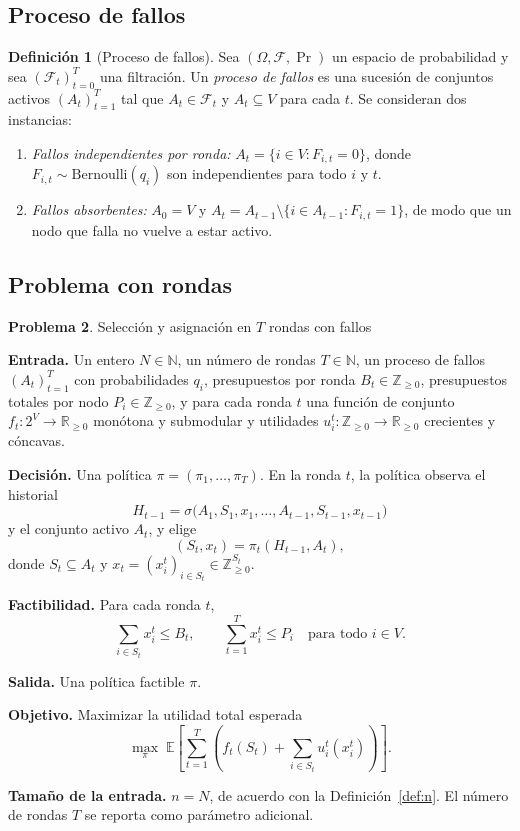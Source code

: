 \documentclass[11pt,a4paper]{article}
\theoremstyle{definition}
\newtheorem{definicion}{Definición}[section]
\newtheorem{problema}[definicion]{Problema}
\theoremstyle{plain}
\newcommand{\N}{\mathbb{N}}
\newcommand{\Z}{\mathbb{Z}}
\newcommand{\R}{\mathbb{R}}
\begin{document}
\subsection{Proceso de fallos}

\begin{definicion}[Proceso de fallos]
Sea $(\Omega,\mathcal{F},\Pr)$ un espacio de probabilidad y sea
$(\mathcal{F}_t)_{t=0}^{T}$ una filtración. Un \emph{proceso de fallos} es una
sucesión de conjuntos activos $(A_t)_{t=1}^{T}$ tal que $A_t\in\mathcal{F}_t$ y
$A_t\subseteq V$ para cada $t$. Se consideran dos instancias:
\begin{enumerate}[leftmargin=*,label=\roman*)]
  \item \emph{Fallos independientes por ronda:}
  $A_t=\{i\in V: F_{i,t}=0\}$, donde
  $F_{i,t}\sim\mathrm{Bernoulli}(q_i)$ son independientes para todo $i$ y $t$.
  \item \emph{Fallos absorbentes:} $A_0=V$ y
  $A_t=A_{t-1}\setminus\{i\in A_{t-1}: F_{i,t}=1\}$, de modo que un nodo que
  falla no vuelve a estar activo.
\end{enumerate}
\end{definicion}

\subsection{Problema con rondas}

\begin{problema}\label{prob:rondas} Selección y asignación en $T$ rondas con fallos

\textbf{Entrada.} Un entero $N\in\N$, un número de rondas $T\in\N$, un proceso
de fallos $(A_t)_{t=1}^{T}$ con probabilidades $q_i$, presupuestos por ronda
$B_t\in\Z_{\ge0}$, presupuestos totales por nodo $P_i\in\Z_{\ge0}$, y para cada
ronda $t$ una función de conjunto $f_t:2^V\to\R_{\ge0}$ monótona y submodular y
utilidades $u_i^t:\Z_{\ge0}\to\R_{\ge0}$ crecientes y cóncavas.

\textbf{Decisión.} Una política $\pi=(\pi_1,\dots,\pi_T)$. En la ronda $t$, la
política observa el historial
\[
  H_{t-1}=\sigma\bigl(A_1,S_1,x_1,\dots,A_{t-1},S_{t-1},x_{t-1}\bigr)
\]
y el conjunto activo $A_t$, y elige
\[
  (S_t,x_t)=\pi_t(H_{t-1},A_t),
\]
donde $S_t\subseteq A_t$ y $x_t=(x_i^t)_{i\in S_t}\in\Z_{\ge0}^{S_t}$.

\textbf{Factibilidad.} Para cada ronda $t$,
\[
  \sum_{i\in S_t} x_i^t\le B_t,
  \qquad
  \sum_{t=1}^{T} x_i^t\le P_i\quad\text{para todo }i\in V.
\]

\textbf{Salida.} Una política factible $\pi$.

\textbf{Objetivo.} Maximizar la utilidad total esperada
\[
  \max_{\pi}\;
  \mathbb{E}\left[
    \sum_{t=1}^{T}
    \left(
      f_t(S_t)+\sum_{i\in S_t} u_i^t(x_i^t)
    \right)
  \right].
\]

\textbf{Tamaño de la entrada.} $n=N$, de acuerdo con la
Definición~\ref{def:n}. El número de rondas $T$ se reporta como parámetro
adicional.
\end{problema}
\end{document}
